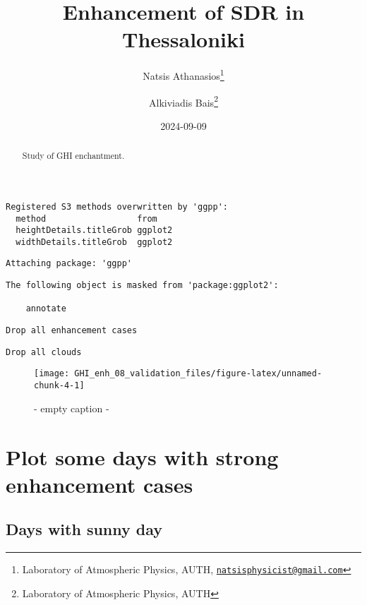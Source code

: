 \documentclass[
  10pt,
  a4paper,oneside]{article}
\title{Enhancement of SDR in Thessaloniki}
\author{Natsis Athanasios\footnote{Laboratory of Atmospheric Physics, AUTH, \href{mailto:natsisphysicist@gmail.com}{\nolinkurl{natsisphysicist@gmail.com}}} \and Alkiviadis Bais\footnote{Laboratory of Atmospheric Physics, AUTH}}
\date{2024-09-09}
\begin{document}
\maketitle
\begin{abstract}
Study of GHI enchantment.
\end{abstract}

{
\hypersetup{linkcolor=}
\setcounter{tocdepth}{4}
\tableofcontents
}
\begin{verbatim}
Registered S3 methods overwritten by 'ggpp':
  method                  from   
  heightDetails.titleGrob ggplot2
  widthDetails.titleGrob  ggplot2
\end{verbatim}

\begin{verbatim}
Attaching package: 'ggpp'
\end{verbatim}

\begin{verbatim}
The following object is masked from 'package:ggplot2':

    annotate
\end{verbatim}

\begin{verbatim}
Drop all enhancement cases
\end{verbatim}

\begin{verbatim}
Drop all clouds
\end{verbatim}

\begin{figure}[H]

{\centering \texttt{[image: GHI\_enh\_08\_validation\_files/figure-latex/unnamed-chunk-4-1]} 

}

\caption{ - empty caption - }\label{fig:unnamed-chunk-4}
\end{figure}

\FloatBarrier

\hypertarget{plot-some-days-with-strong-enhancement-cases}{%
\section{Plot some days with strong enhancement cases}\label{plot-some-days-with-strong-enhancement-cases}}

\FloatBarrier

\hypertarget{days-with-sunny-day}{%
\subsection{Days with sunny day}\label{days-with-sunny-day}}
\end{document}
